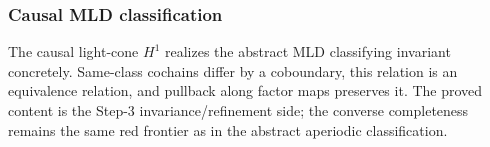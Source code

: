 \subsubsection{Causal MLD classification}

\begin{theorem}\label{thm:causal-mld-classification}\leanok{}
The causal light-cone $H^1$ realizes the abstract MLD classifying invariant
concretely. Same-class cochains differ by a coboundary, this relation is an
equivalence relation, and pullback along factor maps preserves it. The proved
content is the Step-3 invariance/refinement side; the converse completeness
remains the same red frontier as in the abstract aperiodic classification.
\end{theorem}

